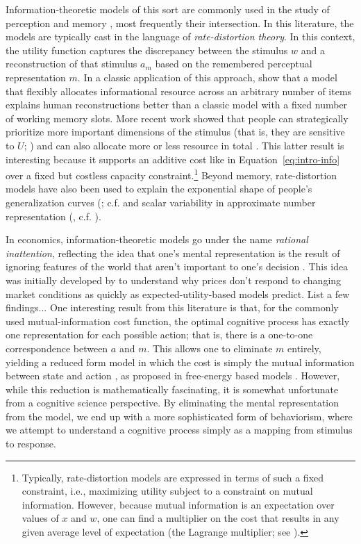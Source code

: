 Information-theoretic models of this sort are commonly used in the study of perception \citep{sims2016rate} and memory \citep{gershman2021rational}, most frequently their intersection. In this literature, the models are typically cast in the language of \emph{rate-distortion theory}. In this context, the utility function captures the discrepancy between the stimulus $w$ and a reconstruction of that stimulus $a_m$ based on the remembered perceptual representation $m$. In a classic application of this approach, \citet{sims2012ideal} show that a model that flexibly allocates informational resource across an arbitrary number of items explains human reconstructions better than a classic model with a fixed number of working memory slots. More recent work showed that people can strategically prioritize more important dimensions of the stimulus (that is, they are sensitive to $U$; \citealp{yoo2018strategic}) and can also allocate more or less resource in total \citep{berg2018resourcerational}. This latter result is interesting because it supports an additive cost like in Equation~\ref{eq:intro-info} over a fixed but costless capacity constraint.\footnote{
  Typically, rate-distortion models are expressed in terms of such a fixed constraint, i.e., maximizing utility subject to a constraint on mutual information. However, because mutual information is an expectation over values of $x$ and $w$, one can find a multiplier on the cost that results in any given average level of expectation (the Lagrange multiplier; see \citealp{ortega2013thermodynamics}).
} Beyond memory, rate-distortion models have also been used to explain the exponential shape of people's generalization curves (\citealp{sims2018efficient}; c.f. \citealp{shepard1987universal} and scalar variability in approximate number representation (\citealp{piantadosi2016rational}, c.f. \citealp{fechner1860elemente}).

In economics, information-theoretic models go under the name \emph{rational inattention}, reflecting the idea that one's mental representation is the result of ignoring features of the world that aren't important to one's decision \citep{sims2003implications,caplin2013behavioral}. This idea was initially developed by \citet{sims1998stickiness} to understand why prices don't respond to changing market conditions as quickly as expected-utility-based models predict. List a few findings... One interesting result from this literature is that, for the commonly used mutual-information cost function, the optimal cognitive process has exactly one representation for each possible action; that is, there is a one-to-one correspondence between $a$ and $m$. This allows one to eliminate $m$ entirely, yielding a reduced form model in which the cost is simply the mutual information between state and action \citep{matejka2015rational}, as proposed in free-energy based models \citep{friston2010freeenergy,ortega2013thermodynamics}. However, while this reduction is mathematically fascinating, it is somewhat unfortunate from a cognitive science perspective. By eliminating the mental representation from the model, we end up with a more sophisticated form of behaviorism, where we attempt to understand a cognitive process simply as a mapping from stimulus to response.

